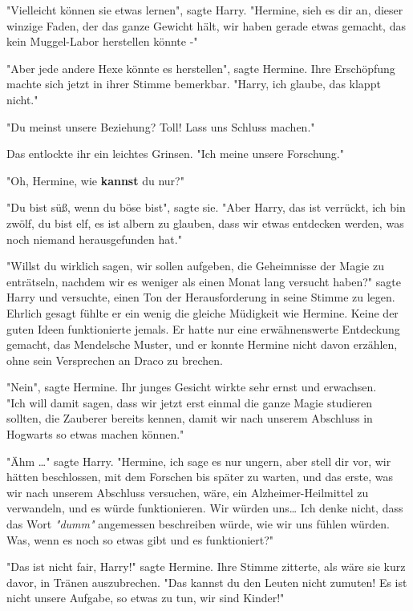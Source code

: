 {"Vielleicht können sie etwas lernen", sagte Harry. "Hermine, sieh es dir an, dieser winzige Faden, der das ganze Gewicht hält, wir haben gerade etwas gemacht, das kein Muggel-Labor herstellen könnte -"

"Aber jede andere Hexe könnte es herstellen", sagte Hermine. Ihre Erschöpfung machte sich jetzt in ihrer Stimme bemerkbar. "Harry, ich glaube, das klappt nicht."

"Du meinst unsere Beziehung? Toll! Lass uns Schluss machen."

Das entlockte ihr ein leichtes Grinsen. "Ich meine unsere Forschung."

"Oh, Hermine, wie \textbf{kannst} du nur?"

"Du bist süß, wenn du böse bist", sagte sie. "Aber Harry, das ist verrückt, ich bin zwölf, du bist elf, es ist albern zu glauben, dass wir etwas entdecken werden, was noch niemand herausgefunden hat."

"Willst du wirklich sagen, wir sollen aufgeben, die Geheimnisse der Magie zu enträtseln, nachdem wir es weniger als einen Monat lang versucht haben?" sagte Harry und versuchte, einen Ton der Herausforderung in seine Stimme zu legen. Ehrlich gesagt fühlte er ein wenig die gleiche Müdigkeit wie Hermine. Keine der guten Ideen funktionierte jemals. Er hatte nur eine erwähnenswerte Entdeckung gemacht, das Mendelsche Muster, und er konnte Hermine nicht davon erzählen, ohne sein Versprechen an Draco zu brechen.

"Nein", sagte Hermine. Ihr junges Gesicht wirkte sehr ernst und erwachsen.\\ "Ich will damit sagen, dass wir jetzt erst einmal die ganze Magie studieren sollten, die Zauberer bereits kennen, damit wir nach unserem Abschluss in Hogwarts so etwas machen können."

"Ähm …" sagte Harry. "Hermine, ich sage es nur ungern, aber stell dir vor, wir hätten beschlossen, mit dem Forschen bis später zu warten, und das erste, was wir nach unserem Abschluss versuchen, wäre, ein Alzheimer-Heilmittel zu verwandeln, und es würde funktionieren. Wir würden uns… Ich denke nicht, dass das Wort \emph{"dumm"} angemessen beschreiben würde, wie wir uns fühlen würden.\\ Was, wenn es noch so etwas gibt und es funktioniert?"

"Das ist nicht fair, Harry!" sagte Hermine. Ihre Stimme zitterte, als wäre sie kurz davor, in Tränen auszubrechen. "Das kannst du den Leuten nicht zumuten! Es ist nicht unsere Aufgabe, so etwas zu tun, wir sind Kinder!"

}

